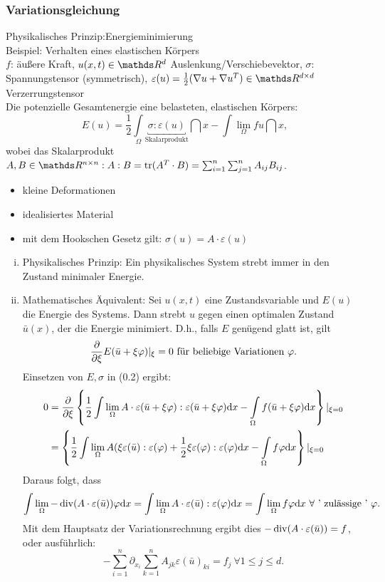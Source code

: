 \subsubsection{Variationsgleichung}
Physikalisches Prinzip:Energieminimierung\\
Beispiel: Verhalten eines elastischen Körpers\\
$f$: äußere Kraft, $u(x,t)\in \R^d$ Auslenkung/Verschiebevektor, $\sigma$: Spannungstensor (symmetrisch), $\varepsilon(u)=\frac{1}{2}(\nabla u + \nabla u^T)\in \R^{d\times d}$ Verzerrungstensor\\
Die potenzielle Gesamtenergie eine belasteten, elastischen Körpers:
\[
E(u) = \frac{1}{2} \int\limits_\Omega \underbracket{\sigma:\varepsilon(u)}_{\text{Skalarprodukt}}\dint x - \int\lim\limits_{\Omega} f u \dint x,
\]
wobei das Skalarprodukt $A,B\in \R^{n\times n}: A:B = \tr(A^T\cdot B) = \sum_{i=1}^{n}\sum_{j=1}^{n} A_{ij}B_{ij}$.

\begin{itemize}
	\item kleine Deformationen
	\item idealisiertes Material
	\item mit dem Hookschen Gesetz gilt: $\sigma(u) = A \cdot \varepsilon(u)$
\end{itemize}

\begin{enumerate}[(i)]
	\item Physikalisches Prinzip: Ein physikalisches System strebt immer in den Zustand minimaler Energie.
	\item Mathematisches Äquivalent: Sei $u(x,t)$ eine Zustandsvariable und $E(u)$ die Energie des Systems.
	Dann strebt $u$ gegen einen optimalen Zustand $\bar{u}(x)$, der die Energie minimiert.
	D.h., falls $E$ genügend glatt ist, gilt
	\begin{align}
	\frac{\partial  }{\partial \xi} E(\bar{u} + \xi \varphi)|_\xi = 0 \text{ für beliebige Variationen } \varphi.
	\end{align}
	Einsetzen von $E,\sigma$ in (0.2) ergibt:
	\begin{align*}
	0 &= \frac{\partial  }{\partial \xi}  \left\{\frac{1}{2} \int\lim\limits_{\Omega} A \cdot \varepsilon(\bar{u}+\xi \varphi):\varepsilon(\bar{u}+\xi \varphi)\mathrm{d} x - \int\limits_{\Omega} f(\bar{u}+\xi \varphi) \mathrm{d} x\right\}|_{\xi=0}\\
	&= \left\{\frac{1}{2} \int\lim\limits_{\Omega} A (\xi \varepsilon(\bar{u}):\varepsilon(\varphi) + \frac{1}{2}\xi\varepsilon(\varphi):\varepsilon(\varphi)\mathrm{d} x - \int\limits_{\Omega} f\varphi \mathrm{d} x\right\}|_{\xi=0}
	\end{align*}
	Daraus folgt, dass 
	\[
	\int\lim\limits_{\Omega} - \operatorname{div}(A\cdot \varepsilon(\bar{u}))\varphi \mathrm{d} x = \int\lim\limits_{\Omega} A\cdot \varepsilon(\bar{u}):\varepsilon(\varphi)\mathrm{d} x = \int\lim\limits_{\Omega} f \varphi \mathrm{d} x ~\forall \text{ ' zulässige ' } \varphi.
	\]
	Mit dem Hauptsatz der Variationsrechnung ergibt dies $-\operatorname{div}(A\cdot \varepsilon(\bar{u}))=f$, oder ausführlich:
	\[
	-\sum_{i=1}^{n}\partial_{x_i} \sum_{k=1}^{n} A_{jk}\varepsilon(\bar{u})_{ki} = f_j ~\forall 1\le j \le d.
	\]
\end{enumerate}

